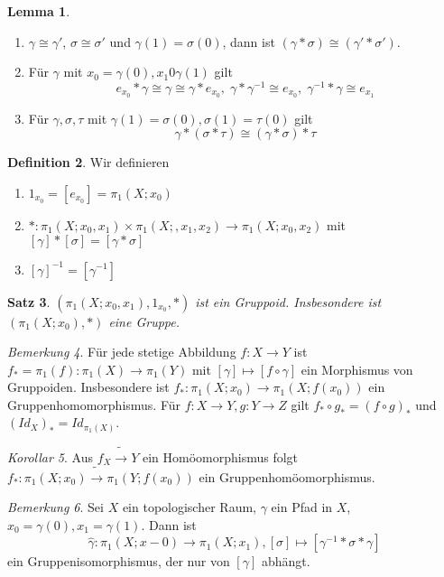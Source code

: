 \documentclass[a4paper, 12pt]{article}
\theoremstyle{plain}
\newtheorem{theorem}{Satz}[section] %
\theoremstyle{definition}
\newtheorem{definition}[theorem]{Definition} %
\theoremstyle{lemma}
\newtheorem{lemma}[theorem]{Lemma}
\theoremstyle{remark}
\newtheorem{remark}[theorem]{Bemerkung}
\theoremstyle{corollary}
\newtheorem{corollary}[theorem]{Korollar}
\theoremstyle{example}
\begin{document}
	\begin{lemma}
		\begin{enumerate}
			\item $\gamma \cong \gamma'$, $\sigma \cong \sigma'$ und $\gamma(1) = \sigma(0)$, dann ist $(\gamma * \sigma) \cong (\gamma' * \sigma')$.
			\item Für $\gamma$ mit $x_0 = \gamma(0), x_1 0 \gamma(1)$ gilt \[e_{x_0} * \gamma \cong \gamma \cong \gamma * e_{x_0}, \; \gamma * \gamma^{-1} \cong e_{x_0}, \;  \gamma^{-1} * \gamma \cong e_{x_1}\]
			\item Für $\gamma, \sigma, \tau$ mit $\gamma(1) = \sigma(0), \sigma(1) = \tau(0)$ gilt \[\gamma * (\sigma * \tau) \cong (\gamma * \sigma) * \tau\]
		\end{enumerate}
	\end{lemma}
	\begin{definition}
		Wir definieren \begin{enumerate}
			\item $1_{x_0} = [e_{x_0}] = \pi_1(X;x_0)$
			\item $* : \pi_1(X;x_0,x_1) \times \pi_1(X;,x_1,x_2) \to \pi_1(X; x_0,x_2)$ mit $[\gamma] * [\sigma] = [\gamma * \sigma]$
			\item $[\gamma]^{-1} = [\gamma^{-1}]$
		\end{enumerate}
	\end{definition}
	\begin{theorem}
		$(\pi_1(X;x_0,x_1), 1_{x_0}, *)$ ist ein Gruppoid. Insbesondere ist $(\pi_1(X;x_0),*)$ eine Gruppe.
	\end{theorem}
	\begin{remark}
		Für jede stetige Abbildung $f:X \to Y$ ist $f_* = \pi_1(f): \pi_1(X) \to \pi_1(Y)$ mit $[\gamma] \mapsto [f \circ \gamma]$ ein Morphismus von Gruppoiden. Insbesondere ist $f_*: \pi_1(X; x_0) \to \pi_1(X; f(x_0))$ ein Gruppenhomomorphismus. Für $f:X \to Y, g:Y \to Z$ gilt $f_* \circ g_* = (f\circ g)_*$ und $(Id_X)_* = Id_{\pi_1(X)}$.
	\end{remark}
	\begin{corollary}
		Aus $f_ X \tilde{\to} Y$ ein Homöomorphismus folgt $f_*: \pi_1(X;x_0) \tilde{\to} \pi_1(Y;f(x_0))$ ein Gruppenhomöomorphismus.
	\end{corollary}
	\begin{remark}
		Sei $X$ ein topologischer Raum, $\gamma$ ein Pfad in $X$, $x_0 = \gamma(0), x_1 = \gamma(1)$. Dann ist \[\hat{\gamma}: \pi_1(X;x-0) \to \pi_1(X;x_1), [\sigma] \mapsto [\gamma^{-1} * \sigma * \gamma]\] ein Gruppenisomorphismus, der nur von $[\gamma]$ abhängt.
	\end{remark}
\end{document}
